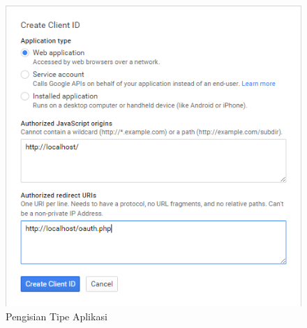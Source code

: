 \begin{figure}[H]
\centering
\includegraphics[scale=1]{Gambar/tipeaplikasisudahdiisi.png}
\caption[Pengisian Tipe Aplikasi]{Pengisian Tipe Aplikasi} 
\label{fig:tipeaplikasisudahdiisi}
\end{figure}

